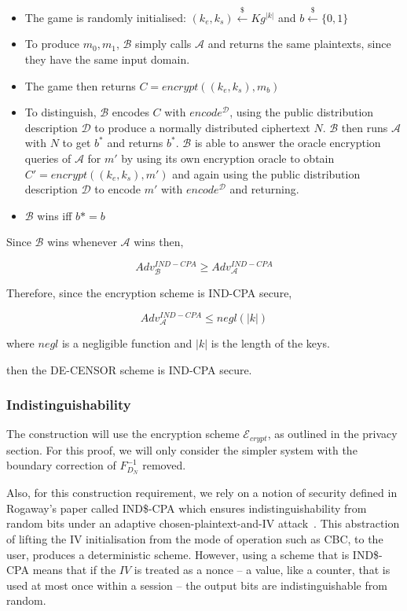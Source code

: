 \documentclass[ %
                    author={Samuel Russell},
                supervisor={Prof. Bogdan Warinschi},
                    degree={MEng},
                     title={Innocuous Ciphertexts},
                  subtitle={The DE-CENSOR Scheme},
                      type={Research},
                      year={2018} ]{dissertation}
\begin{document}
\begin{itemize}


\item The game is randomly initialised: $(k_e, k_s) \xleftarrow{\$} Kg^{|k|}$ and $b \xleftarrow{\$} \{0,1\}$

\item To produce $m_0, m_1$, $\mathcal{B}$ simply calls  $\mathcal{A}$ and returns the same plaintexts, since they have the same input domain.

\item The game then returns $C = encrypt((k_e, k_s), m_b)$

\item To distinguish, $\mathcal{B}$ encodes $C$ with $encode^\mathcal{D}$, using the public distribution description $\mathcal{D}$ to produce a normally distributed ciphertext $N$. $\mathcal{B}$ then runs $\mathcal{A}$ with $N$ to get $b^*$ and returns $b^*$. $\mathcal{B}$ is able to answer the oracle encryption queries of $\mathcal{A}$ for $m'$ by using its own encryption oracle to obtain $C' = encrypt( (k_e, k_s), m')$ and again using the public distribution description $\mathcal{D}$ to encode $m'$ with $encode^\mathcal{D}$ and returning.

\item $\mathcal{B}$ wins iff $b* = b$

\end{itemize}

Since $\mathcal{B}$ wins whenever $\mathcal{A}$ wins then,

$$Adv_\mathcal{B}^{IND-CPA} \geq Adv_\mathcal{A}^{IND-CPA}$$

Therefore, since the encryption scheme is IND-CPA secure,

$$Adv_\mathcal{A}^{IND-CPA} \leq negl(|k|)$$

where $negl$ is a negligible function and $|k|$ is the length of the keys.

then the DE-CENSOR scheme is IND-CPA secure.

\subsubsection{Indistinguishability}


The construction will use the encryption scheme $\mathcal{E}_{crypt}$, as outlined in the privacy section.
For this proof, we will only consider the simpler system with the boundary correction of $F^{-1}_{D_N}$ removed.

Also, for this construction requirement, we rely on a notion of security defined in Rogaway's paper called IND\$-CPA which ensures indistinguishability from random bits under an adaptive chosen-plaintext-and-IV attack~\cite{ind_dollar}.
This abstraction of lifting the IV initialisation from the mode of operation such as CBC, to the user, produces a deterministic scheme.
However, using a scheme that is IND\$-CPA means that if the $IV$ is treated as a nonce -- a value, like a counter, that is used at most once within a session -- the output bits are indistinguishable from random.
\end{document}
